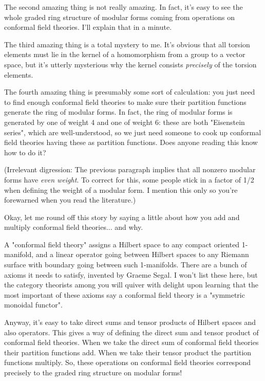 The second amazing thing is not really amazing.  In fact, it's
easy to see the whole graded ring structure of modular forms
coming from operations on conformal field theories.  I'll explain
that in a minute.

The third amazing thing is a total mystery to me.  It's
obvious that all torsion elements must lie in the kernel of a
homomorphism from a group to a vector space, but it's utterly
mysterious why the kernel consists \emph{precisely} of the torsion
elements.

The fourth amazing thing is presumably some sort of calculation:
you just need to find enough conformal field theories to make
sure their partition functions generate the ring of modular
forms.  In fact, the ring of modular forms is generated by one
of weight 4 and one of weight 6: these are both "Eisenstein 
series", which are well-understood, so we just need someone to 
cook up conformal field theories having these as partition 
functions.  Does anyone reading this know how to do it?

(Irrelevant digression: The previous paragraph implies that 
all nonzero modular forms have \emph{even weight}.  To correct for
this, some people stick in a factor of 1/2 when defining the 
weight of a modular form.  I mention this only so you're 
forewarned when you read the literature.)
 
Okay, let me round off this story by saying a little about 
how you add and multiply conformal field theories... and why.

A "conformal field theory" assigns a Hilbert space to any 
compact oriented 1-manifold, and a linear operator going
between Hilbert spaces to any Riemann surface with boundary 
going between such 1-manifolds.  There are a bunch of axioms
it needs to satisfy, invented by Graeme Segal.  I won't list 
these here, but the category theorists among you will quiver
with delight upon learning that the most important of these
axioms say a conformal field theory is a "symmetric monoidal 
functor".  

Anyway, it's easy to take direct sums and tensor products of 
Hilbert spaces and also operators.  This gives a way of 
defining the direct sum and tensor product of conformal 
field theories.  When we take the direct sum of conformal 
field theories their partition functions add.  When we take 
their tensor product the partition functions multiply.  So, 
these operations on conformal field theories correspond 
precisely to the graded ring structure on modular forms!

